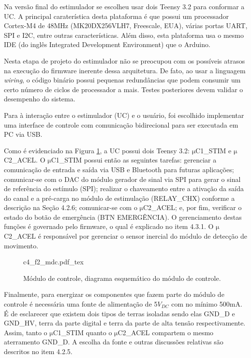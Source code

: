 Na versão final do estimulador se escolheu usar dois Teensy 3.2 para conformar a \acrshort{UC}. A principal caraterística desta plataforma é que possui um processador Cortex-M4 de 48MHz (MK20DX256VLH7, Freescale, EUA), várias portas \acrshort{UART}, \acrshort{SPI} e \acrshort{I2C}, entre outras características. Além disso, esta plataforma usa o mesmo \acrshort{IDE} (do inglês Integrated Development Environment) que o Arduino.

Nesta etapa de projeto do estimulador não se preocupou com os possíveis atrasos na execução do firmware inerente dessa arquitetura. De fato, ao usar a linguagem \textit{wiring}, o código binário possui pequenas redundâncias que podem consumir um certo número de ciclos de processador a mais. Testes posteriores devem validar o desempenho do sistema.

Para à interação entre o estimulador (\acrshort{UC}) e o usuário, foi escolhido implementar uma interface de controle com comunicação bidirecional para ser executada em \acrshort{PC} via \acrshort{USB}.

Como é evidenciado na Figura \ref{fig:c4_f2_mdc}, a \acrshort{UC} possui dois Teensy 3.2: $\mathrm{\mu}$C1\_STIM e $\mathrm{\mu}$C2\_ACEL. O $\mathrm{\mu}$C1\_STIM possui então as seguintes tarefas: gerenciar a comunicação de entrada e saída via \acrshort{USB} e Bluetooth para futuras aplicações; comunicar-se com o \acrshort{DAC} do módulo gerador de sinal via \acrshort{SPI} para gerar o sinal de referência do estímulo (\acrshort{SPI}); realizar o chaveamento entre a ativação da saída do canal e a pré-carga no módulo de estimulação (RELAY\_CHX) conforme a descrição na Seção 4.2.6; comunicar-se com o $\mathrm{\mu}$C2\_ACEL; e, por fim, verificar o estado do botão de emergência (BTN EMERGÊNCIA). O gerenciamento destas funções é governado pelo firmware, o qual é explicado no item 4.3.1. O $\mathrm{\mu}$C2\_ACEL é responsável por gerenciar o sensor inercial do módulo de detecção de movimento.

\begin{figure}[h]
    \centering %
    \scriptsize %
    \def\svgwidth{0.61\columnwidth}%
    {c4_f2_mdc.pdf_tex}
    \caption{Módulo de controle, diagrama esquemático do módulo de controle.}
    \label{fig:c4_f2_mdc}
\end{figure}

Finalmente, para energizar os componentes que fazem parte do módulo de controle é necessária uma fonte de alimentação de 5$V_{DC}$ com no mínimo 500mA. É de esclarecer que existem dois tipos de terras isoladas sendo elas GND\_D e GND\_HV, terra da parte digital e terra da parte de alta tensão respectivamente. Assim, tanto o $\mathrm{\mu}$C1\_STIM quanto o $\mathrm{\mu}$C2\_ACEL compartem o mesmo aterramento GND\_D. A escolha da fonte e outras discussões relativas são descritos no item 4.2.5. 

